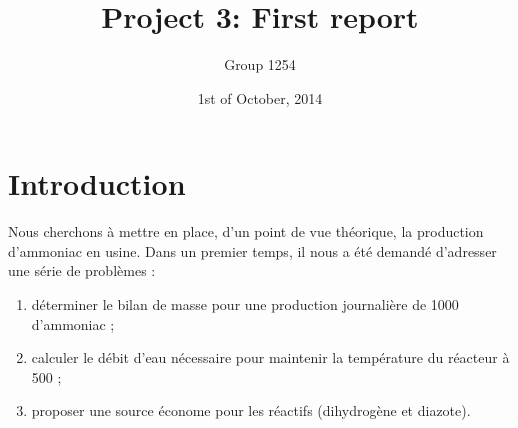 \documentclass[a4paper,12pt, oneside]{article}
\title{Project 3: First report}
\author{Group 1254}
\date{1st of October, 2014}
\begin{document}
\maketitle

\section*{Introduction}

Nous cherchons à mettre en place, d'un point de vue théorique, la production d'ammoniac en usine. Dans un premier temps, il nous a été demandé d'adresser une série de problèmes :
\begin{enumerate}
 \item déterminer le bilan de masse pour une production journalière de \unit{1000}{\ton} d'ammoniac ;
 \item calculer le débit d'eau nécessaire pour maintenir la température du réacteur à \unit{500}{\celsius} ;
 \item proposer une source économe pour les réactifs (dihydrogène et diazote).
\end{enumerate}


\end{document}
